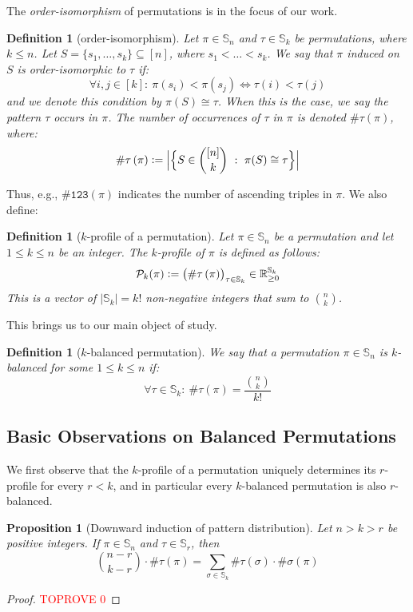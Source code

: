 \documentclass{article}
\newtheorem{proposition}[theorem]{Proposition}
\newtheorem{definition}[theorem]{Definition}
\newcommand{\Sn}{\mathbb{S}_n}
\newcommand{\RR}{\mathbb{R}}
\newcommand{\pc}[2]{{\# \mathtt{ #1 } \left( #2 \right)}}
\newcommand{\eqdef}{\vcentcolon=}
\theoremstyle{remark}
\theoremstyle{plain}
\begin{document}
The \emph{order-isomorphism} of permutations is in the focus of our work.

\begin{definition}[order-isomorphism]
    \label{defn:order_isom}
    Let $\pi \in \Sn$ and $\tau \in \mathbb{S}_k$ be permutations, where $k \le n$. Let $S = \{s_1, \dots, s_k\} \subseteq [n]$, where $s_1 < \dots < s_k$. We say that $\pi$ induced on $S$ is order-isomorphic to $\tau$ if:
    \[
        \forall i,j \in [k]:\ \pi(s_i) < \pi(s_j) \iff \tau(i) < \tau(j)
    \]    
and we denote this condition by $\pi(S) \cong \tau$.
When this is the case, we say the pattern $\tau$ occurs in $\pi$. 
The number of occurrences of $\tau$ in $\pi$ is denoted $\pc{\tau}{\pi}$, where:
\[
    \pc{\tau}{\pi} \eqdef \Big| \Big\{ S \in \binom{[n]}{k}\ :\ \pi(S) \cong \tau \Big\} \Big|
\]
\end{definition}

Thus, e.g., $\pc{123}{\pi}$ indicates the number of ascending triples in $\pi$. 
We also define:

\begin{definition}[$k$-profile of a permutation]
    \label{defn:perm_profile}
    Let $\pi \in \Sn$ be a permutation and let $1 \le k \le n$ be an integer. The $k$-profile of $\pi$ is defined as follows:
    \[
        \mathcal{P}_k(\pi) \eqdef \big( \pc{\tau}{\pi} \big)_{\tau \in \mathbb{S}_k} \in \RR_{\ge 0}^{\mathbb{S}_k}
    \]
This is a vector of $|\mathbb{S}_k|=k!$ non-negative integers that sum to $\binom{n}{k}$.
\end{definition}

This brings us to our main object of study.

\begin{definition}[$k$-balanced permutation] 
We say that a permutation $\pi \in \Sn$ is $k$-balanced for some $1 \leq k \le n$ if:
    \[
        \forall \tau \in \mathbb{S}_k:\ \pc{\tau}{\pi} = \frac{\binom{n}{k}}{k!}
    \]
\end{definition}

\subsection{Basic Observations on Balanced Permutations}

We first observe that
the $k$-profile of a permutation uniquely determines its $r$-profile
for every $r<k$, and in particular
every $k$-balanced permutation is also $r$-balanced.  

\begin{proposition}[Downward induction of pattern distribution]
\label{prop:down_ind_k_prof}
Let $n>k>r$ be positive integers. If $\pi \in \Sn$ and $\tau \in \mathbb{S}_{r}$, then
\begin{equation}\label{eq:induce}
        \binom{n-r}{k-r} \cdot \pc{\tau}{\pi} = \sum_{\sigma \in \mathbb{S}_k} \pc{\tau}{\sigma} \cdot \pc{\sigma}{\pi}
\end{equation}
\end{proposition}
\begin{proof}\textcolor{red}{TOPROVE 0}\end{proof}
\end{document}
